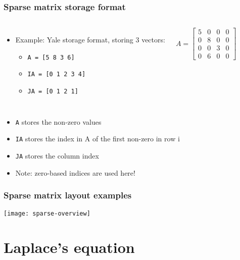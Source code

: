 \begin{frame}[fragile]
  \frametitle{Sparse matrix storage format}
  \begin{columns}
  \begin{itemize}
    \item Example: Yale storage format, storing 3 vectors:
    \begin{itemize}
      \item \lstinline$A = [5 8 3 6]$
      \item \lstinline$IA = [0 1 2 3 4]$
      \item \lstinline$JA = [0 1 2 1]$
    \end{itemize}
  \end{itemize}
  \[
   A = 
   \begin{bmatrix}
    5 & 0 & 0 & 0\\
    0 & 8 & 0 & 0\\
    0 & 0 & 3 & 0\\
    0 & 6 & 0 & 0
    \end{bmatrix}
  \]
  \end{columns}
  \begin{itemize}
    \item \lstinline$A$ stores the non-zero values
    \item \lstinline$IA$ stores the index in A of the first non-zero in row i
    \item \lstinline$JA$ stores the column index
    \item Note: zero-based indices are used here!
\end{itemize}
\end{frame}

\begin{frame}[fragile]
  \frametitle{Sparse matrix layout examples}
  \begin{center}
   \texttt{[image: sparse-overview]}
  \end{center}
\end{frame}

\section{Laplace's equation}
